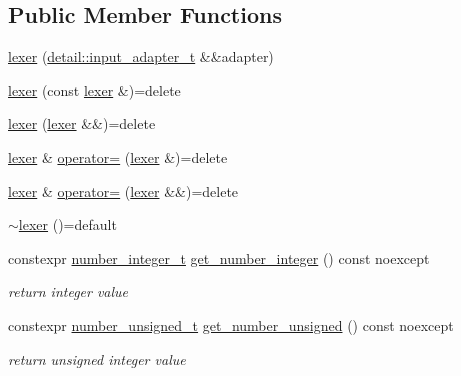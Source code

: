 \subsection*{Public Member Functions}
\begin{DoxyCompactItemize}
\item 
\mbox{\hyperlink{classnlohmann_1_1detail_1_1lexer_ab6818e0fc05f4a52c65aeb967dd79919}{lexer}} (\mbox{\hyperlink{namespacenlohmann_1_1detail_ae132f8cd5bb24c5e9b40ad0eafedf1c2}{detail\+::input\+\_\+adapter\+\_\+t}} \&\&adapter)
\item 
\mbox{\hyperlink{classnlohmann_1_1detail_1_1lexer_a2e8ce2a0d266d148b69dfbcc2e4ad71a}{lexer}} (const \mbox{\hyperlink{classnlohmann_1_1detail_1_1lexer}{lexer}} \&)=delete
\item 
\mbox{\hyperlink{classnlohmann_1_1detail_1_1lexer_a9045348915010649fad1f15e80b6e34d}{lexer}} (\mbox{\hyperlink{classnlohmann_1_1detail_1_1lexer}{lexer}} \&\&)=delete
\item 
\mbox{\hyperlink{classnlohmann_1_1detail_1_1lexer}{lexer}} \& \mbox{\hyperlink{classnlohmann_1_1detail_1_1lexer_a33e97dee7c5faf1b36aff5b74a6c8f55}{operator=}} (\mbox{\hyperlink{classnlohmann_1_1detail_1_1lexer}{lexer}} \&)=delete
\item 
\mbox{\hyperlink{classnlohmann_1_1detail_1_1lexer}{lexer}} \& \mbox{\hyperlink{classnlohmann_1_1detail_1_1lexer_af8ab91a774484fa220ba073421c8f452}{operator=}} (\mbox{\hyperlink{classnlohmann_1_1detail_1_1lexer}{lexer}} \&\&)=delete
\item 
\mbox{\hyperlink{classnlohmann_1_1detail_1_1lexer_a2f2ef6f5aca9a0c48fcfb1290f7b2b0d}{$\sim$lexer}} ()=default
\item 
constexpr \mbox{\hyperlink{classnlohmann_1_1detail_1_1lexer_a9cd1b11cc67edbfb2613c788b5bd337c}{number\+\_\+integer\+\_\+t}} \mbox{\hyperlink{classnlohmann_1_1detail_1_1lexer_afa338d17c0a7e834c73104258a2c8ced}{get\+\_\+number\+\_\+integer}} () const noexcept
\begin{DoxyCompactList}\small\item\em return integer value \end{DoxyCompactList}\item 
constexpr \mbox{\hyperlink{classnlohmann_1_1detail_1_1lexer_a105d1dfeab414a572655895cdd96a52a}{number\+\_\+unsigned\+\_\+t}} \mbox{\hyperlink{classnlohmann_1_1detail_1_1lexer_a56640fb92293e0c17742ca3c814d74d6}{get\+\_\+number\+\_\+unsigned}} () const noexcept
\begin{DoxyCompactList}\small\item\em return unsigned integer value \end{DoxyCompactList}\item 

\end{DoxyCompactItemize}
